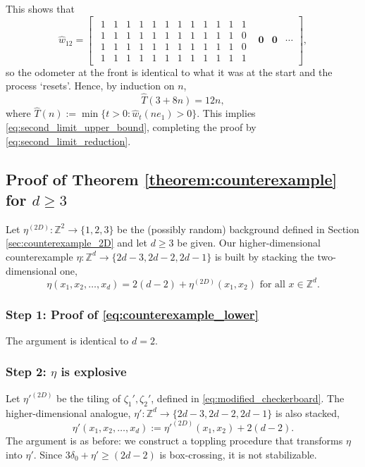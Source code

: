 \documentclass[aap]{imsart}
\newcommand{\Z}{\mathbb{Z}}
\begin{document}
This shows that
\[
\hat{w}_{12} = 
\begin{bmatrix}
\begin{smallmatrix}
1 & 1 & 1 & 1 & 1 & 1 & 1 & 1 & 1 & 1 & 1 & 1 \\ 
1 & 1 & 1 & 1 & 1 & 1 & 1 & 1 & 1 & 1 & 1 & 0 \\ 
1 & 1 & 1 & 1 & 1 & 1 & 1 & 1 & 1 & 1 & 1 & 0 \\ 
1 & 1 & 1 & 1 & 1 & 1 & 1 & 1 & 1 & 1 & 1 & 1
\end{smallmatrix}
& 
\mathbf{0} 
&
\mathbf{0} 
& \cdots
\end{bmatrix},
\]
so the odometer at the front is identical to what it was at the start and the process `resets'. Hence, 
by induction on $n$,
\begin{equation}
\hat{T}(3 + 8 n) = 12 n, 
\end{equation}
where $\hat{T}(n) := \min\{ t > 0 : \hat{w}_t(n e_1) > 0 \}$. 
This implies  \eqref{eq:second_limit_upper_bound}, completing the proof by \eqref{eq:second_limit_reduction}.



\subsection{Proof of Theorem \ref{theorem:counterexample} for \texorpdfstring{$d \geq 3$}{d > 2}} \label{sec:proof_of_generalization}
Let $\eta^{(2D)}: \Z^2 \to \{1, 2, 3\}$ be the (possibly random) background defined in Section \ref{sec:counterexample_2D} and let $d \geq 3$ be given. Our higher-dimensional counterexample $\eta: \Z^d \to \{ 2 d - 3, 2 d -2, 2 d - 1\}$
is built by stacking the two-dimensional one, 
\begin{equation} \label{eq:stacked_tiling1}
\eta(x_1, x_2, \ldots, x_d) = 2  (d- 2) + \eta^{(2D)}(x_1, x_2) \mbox{ for all $x \in \Z^d$}.
\end{equation}
\subsubsection*{Step 1: Proof of \eqref{eq:counterexample_lower}}
The argument is identical to $d = 2$. 



\subsubsection*{Step 2: $\eta$ is explosive}

Let ${\eta'}^{(2D)}$ be the tiling of $\zeta_1', \zeta_2'$, defined in \eqref{eq:modified_checkerboard}.
The higher-dimensional analogue, $\eta': \Z^d \to \{ 2 d - 3, 2 d -2, 2 d - 1\}$ is also stacked, 
\begin{equation} \label{eq:stacked_tiling2}
\eta'(x_1, x_2, \ldots, x_d) := {\eta'}^{(2D)}(x_1, x_2) + 2  (d - 2).
\end{equation}
The argument is as before: we construct a toppling procedure that transforms $\eta$ into $\eta'$. Since $3  \delta_0 + \eta' \geq (2 d - 2)$ is box-crossing, it is not stabilizable. 
\end{document}
